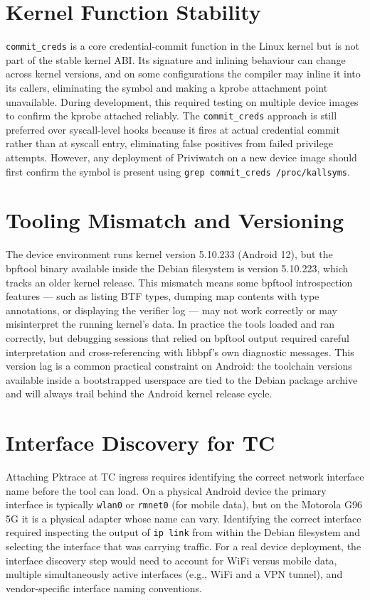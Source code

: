 \documentclass{mnitjaipur}
\begin{document}
\section{Kernel Function Stability}
\texttt{commit\_creds} is a core credential-commit function in the Linux kernel but is not part of the stable kernel ABI. Its signature and inlining behaviour can change across kernel versions, and on some configurations the compiler may inline it into its callers, eliminating the symbol and making a kprobe attachment point unavailable. During development, this required testing on multiple device images to confirm the kprobe attached reliably. The \texttt{commit\_creds} approach is still preferred over syscall-level hooks because it fires at actual credential commit rather than at syscall entry, eliminating false positives from failed privilege attempts. However, any deployment of Priviwatch on a new device image should first confirm the symbol is present using \texttt{grep commit\_creds /proc/kallsyms}.

\section{Tooling Mismatch and Versioning}
The device environment runs kernel version 5.10.233 (Android 12), but the bpftool binary available inside the Debian filesystem is version 5.10.223, which tracks an older kernel release. This mismatch means some bpftool introspection features — such as listing BTF types, dumping map contents with type annotations, or displaying the verifier log — may not work correctly or may misinterpret the running kernel's data. In practice the tools loaded and ran correctly, but debugging sessions that relied on bpftool output required careful interpretation and cross-referencing with libbpf's own diagnostic messages. This version lag is a common practical constraint on Android: the toolchain versions available inside a bootstrapped userspace are tied to the Debian package archive and will always trail behind the Android kernel release cycle.

\section{Interface Discovery for TC}
Attaching Pktrace at TC ingress requires identifying the correct network interface name before the tool can load. On a physical Android device the primary interface is typically \texttt{wlan0} or \texttt{rmnet0} (for mobile data), but on the Motorola G96 5G it is a physical adapter whose name can vary. Identifying the correct interface required inspecting the output of \texttt{ip link} from within the Debian filesystem and selecting the interface that was carrying traffic. For a real device deployment, the interface discovery step would need to account for WiFi versus mobile data, multiple simultaneously active interfaces (e.g., WiFi and a VPN tunnel), and vendor-specific interface naming conventions.
\end{document}

